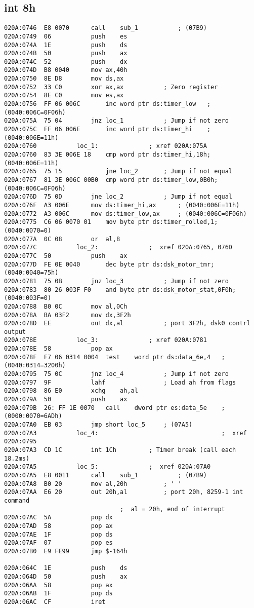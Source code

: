 \documentclass[a4paper,10pt, unknownkeysallowed]{extreport}
\begin{document}
	\begin{center}
		\section*{int 8h}
	\end{center}
\begin{lstlisting}
020A:0746  E8 0070		call	sub_1			; (07B9)
020A:0749  06			push	es
020A:074A  1E			push	ds
020A:074B  50			push	ax
020A:074C  52			push	dx
020A:074D  B8 0040		mov	ax,40h
020A:0750  8E D8		mov	ds,ax
020A:0752  33 C0		xor	ax,ax			; Zero register
020A:0754  8E C0		mov	es,ax
020A:0756  FF 06 006C		inc	word ptr ds:timer_low	; (0040:006C=0F06h)
020A:075A  75 04		jnz	loc_1			; Jump if not zero
020A:075C  FF 06 006E		inc	word ptr ds:timer_hi	; (0040:006E=11h)
020A:0760			loc_1:				; xref 020A:075A
020A:0760  83 3E 006E 18	cmp	word ptr ds:timer_hi,18h; (0040:006E=11h)
020A:0765  75 15			jne	loc_2		; Jump if not equal
020A:0767  81 3E 006C 00B0	cmp	word ptr ds:timer_low,0B0h; (0040:006C=0F06h)
020A:076D  75 0D		jne	loc_2			; Jump if not equal
020A:076F  A3 006E		mov	ds:timer_hi,ax		; (0040:006E=11h)
020A:0772  A3 006C		mov	ds:timer_low,ax		; (0040:006C=0F06h)
020A:0775  C6 06 0070 01	mov	byte ptr ds:timer_rolled,1; (0040:0070=0)
020A:077A  0C 08		or	al,8
020A:077C			loc_2:				;  xref 020A:0765, 076D
020A:077C  50			push	ax
020A:077D  FE 0E 0040		dec	byte ptr ds:dsk_motor_tmr; (0040:0040=75h)
020A:0781  75 0B		jnz	loc_3			; Jump if not zero
020A:0783  80 26 003F F0	and	byte ptr ds:dsk_motor_stat,0F0h; (0040:003F=0)
020A:0788  B0 0C		mov	al,0Ch
020A:078A  BA 03F2		mov	dx,3F2h
020A:078D  EE			out	dx,al			; port 3F2h, dsk0 contrl output
020A:078E			loc_3:				; xref 020A:0781
020A:078E  58			pop	ax
020A:078F  F7 06 0314 0004	test	word ptr ds:data_6e,4	; (0040:0314=3200h)
020A:0795  75 0C		jnz	loc_4			; Jump if not zero
020A:0797  9F			lahf				; Load ah from flags
020A:0798  86 E0		xchg	ah,al
020A:079A  50			push	ax
020A:079B  26: FF 1E 0070	call	dword ptr es:data_5e	; (0000:0070=6ADh)
020A:07A0  EB 03		jmp	short loc_5		; (07A5)
020A:07A3			loc_4:									;  xref 020A:0795
020A:07A3  CD 1C		int	1Ch			; Timer break (call each 18.2ms)
020A:07A5			loc_5:				;  xref 020A:07A0
020A:07A5  E8 0011		call	sub_1			; (07B9)
020A:07A8  B0 20		mov	al,20h			; ' '
020A:07AA  E6 20		out	20h,al			; port 20h, 8259-1 int command
								;  al = 20h, end of interrupt
020A:07AC  5A			pop	dx
020A:07AD  58			pop	ax
020A:07AE  1F			pop	ds
020A:07AF  07			pop	es
020A:07B0  E9 FE99		jmp	$-164h

020A:064C  1E			push	ds
020A:064D  50			push	ax
020A:06AA  58			pop	ax
020A:06AB  1F			pop	ds
020A:06AC  CF			iret

\end{lstlisting}
\end{document}

